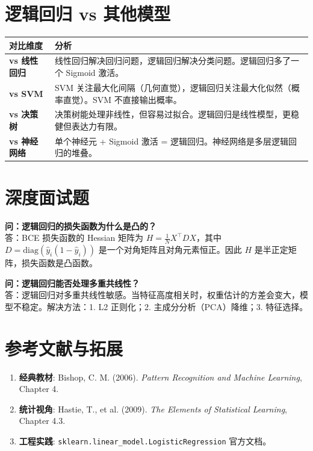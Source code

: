 \documentclass[12pt, a4paper]{article}
\begin{document}
\section{逻辑回归 vs 其他模型}
\begin{table}[h]
\centering
\begin{tabularx}{\textwidth}{|l|X|}
\hline
\textbf{对比维度} & \textbf{分析} \\
\hline
\textbf{vs 线性回归} & 线性回归解决回归问题，逻辑回归解决分类问题。逻辑回归多了一个 Sigmoid 激活。 \\
\hline
\textbf{vs SVM} & SVM 关注最大化间隔（几何直觉），逻辑回归关注最大化似然（概率直觉）。SVM 不直接输出概率。 \\
\hline
\textbf{vs 决策树} & 决策树能处理非线性，但容易过拟合。逻辑回归是线性模型，更稳健但表达力有限。 \\
\hline
\textbf{vs 神经网络} & 单个神经元 + Sigmoid 激活 = 逻辑回归。神经网络是多层逻辑回归的堆叠。 \\
\hline
\end{tabularx}
\end{table}

\section{深度面试题}

\textbf{问：逻辑回归的损失函数为什么是凸的？}\\
答：BCE 损失函数的 Hessian 矩阵为 $H = \frac{1}{N} X^\top D X$，其中 $D = \text{diag}(\hat{y}_i(1-\hat{y}_i))$ 是一个对角矩阵且对角元素恒正。因此 $H$ 是半正定矩阵，损失函数是凸函数。

\textbf{问：逻辑回归能否处理多重共线性？}\\
答：逻辑回归对多重共线性敏感。当特征高度相关时，权重估计的方差会变大，模型不稳定。解决方法：1. L2 正则化；2. 主成分分析（PCA）降维；3. 特征选择。

\section{参考文献与拓展}
\begin{enumerate}
    \item \textbf{经典教材}: Bishop, C. M. (2006). \textit{Pattern Recognition and Machine Learning}, Chapter 4.
    \item \textbf{统计视角}: Hastie, T., et al. (2009). \textit{The Elements of Statistical Learning}, Chapter 4.3.
    \item \textbf{工程实践}: \texttt{sklearn.linear\_model.LogisticRegression} 官方文档。
\end{enumerate}
\end{document}
